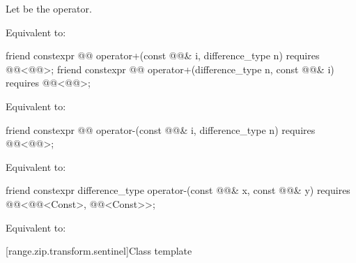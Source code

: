 \begin{itemdescr}
\pnum
Let  be the operator.

\pnum
\effects
Equivalent to:
\end{itemdescr}

%
\begin{itemdecl}
friend constexpr @@ operator+(const @@& i, difference_type n)
  requires @@<@@>;
friend constexpr @@ operator+(difference_type n, const @@& i)
  requires @@<@@>;
\end{itemdecl}

\begin{itemdescr}
\pnum
\effects
Equivalent to:
\end{itemdescr}

%
\begin{itemdecl}
friend constexpr @@ operator-(const @@& i, difference_type n)
  requires @@<@@>;
\end{itemdecl}

\begin{itemdescr}
\pnum
\effects
Equivalent to:
\end{itemdescr}

%
\begin{itemdecl}
friend constexpr difference_type operator-(const @@& x, const @@& y)
  requires @@<@@<Const>, @@<Const>>;
\end{itemdecl}

\begin{itemdescr}
\pnum
\effects
Equivalent to:
\end{itemdescr}

[range.zip.transform.sentinel]{Class template }

